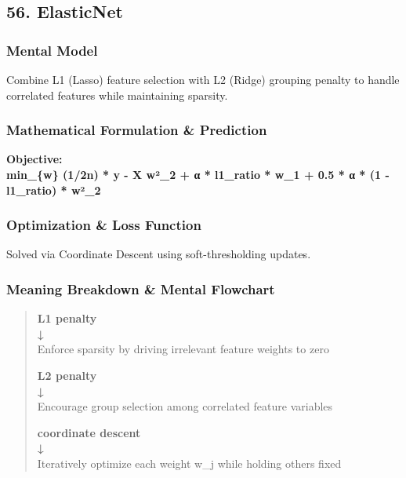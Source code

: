 \documentclass[
  10pt,
  letterpaper,
]{article}
\begin{document}
\hypertarget{elasticnet}{%
\subsection{56. ElasticNet}\label{elasticnet}}

\hypertarget{mental-model-55}{%
\subsubsection{Mental Model}\label{mental-model-55}}

Combine L1 (Lasso) feature selection with L2 (Ridge) grouping penalty to handle correlated features while maintaining sparsity.

\hypertarget{mathematical-formulation-prediction-55}{%
\subsubsection{Mathematical Formulation \& Prediction}\label{mathematical-formulation-prediction-55}}

\textbf{Objective:\\
min\_\{w\} (1/2n) * \textbar\textbar y - X w\textbar\textbar²\_2 + α * l1\_ratio * \textbar\textbar w\textbar\textbar\_1 + 0.5 * α * (1 - l1\_ratio) * \textbar\textbar w\textbar\textbar²\_2}

\hypertarget{optimization-loss-function-55}{%
\subsubsection{Optimization \& Loss Function}\label{optimization-loss-function-55}}

Solved via Coordinate Descent using soft-thresholding updates.

\hypertarget{meaning-breakdown-mental-flowchart-55}{%
\subsubsection{Meaning Breakdown \& Mental Flowchart}\label{meaning-breakdown-mental-flowchart-55}}

\begin{quote}
\textbf{L1 penalty\\
↓\\
}Enforce sparsity by driving irrelevant feature weights to zero

\textbf{L2 penalty\\
↓\\
}Encourage group selection among correlated feature variables

\textbf{coordinate descent\\
↓\\
}Iteratively optimize each weight w\_j while holding others fixed
\end{quote}
\end{document}
